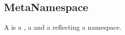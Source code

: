 \subsection{MetaNamespace}
\label{concept-MetaNamespace}

A  is a , a  and a 
reflecting a namespace.



